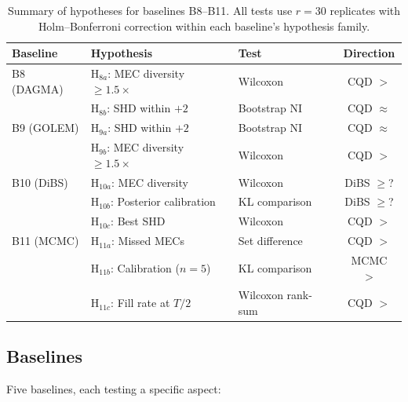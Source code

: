 \documentclass{article}
\theoremstyle{definition}
\theoremstyle{plain}
\theoremstyle{remark}
\begin{document}
\begin{table}[htb]
\centering
\small
\caption{Summary of hypotheses for baselines B8--B11. All tests use
$r = 30$ replicates with Holm--Bonferroni correction within each
baseline's hypothesis family.}
\label{tab:baselines_extended}
\begin{tabular}{lllc}
\toprule
\textbf{Baseline} & \textbf{Hypothesis} & \textbf{Test} & \textbf{Direction} \\
\midrule
B8 (DAGMA) & H$_{8a}$: MEC diversity $\geq 1.5\times$ & Wilcoxon & CQD $>$ \\
            & H$_{8b}$: SHD within $+2$ & Bootstrap NI & CQD $\approx$ \\
B9 (GOLEM) & H$_{9a}$: SHD within $+2$ & Bootstrap NI & CQD $\approx$ \\
            & H$_{9b}$: MEC diversity $\geq 1.5\times$ & Wilcoxon & CQD $>$ \\
B10 (DiBS) & H$_{10a}$: MEC diversity & Wilcoxon & DiBS $\geq$? \\
            & H$_{10b}$: Posterior calibration & KL comparison & DiBS $\geq$? \\
            & H$_{10c}$: Best SHD & Wilcoxon & CQD $>$ \\
B11 (MCMC) & H$_{11a}$: Missed MECs & Set difference & CQD $>$ \\
            & H$_{11b}$: Calibration ($n = 5$) & KL comparison & MCMC $>$ \\
            & H$_{11c}$: Fill rate at $T/2$ & Wilcoxon rank-sum & CQD $>$ \\
\bottomrule
\end{tabular}
\end{table}



\subsection{Baselines}

Five baselines, each testing a specific aspect:
\end{document}
